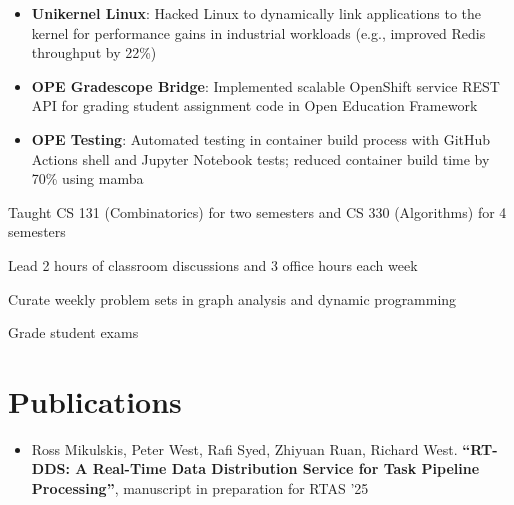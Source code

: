 \documentclass[10pt]{article}
\begin{document}
\begin{FlushLeft}
\begin{itemize}
\item \textbf{Unikernel Linux}: Hacked Linux to dynamically link applications to the kernel for performance gains in industrial workloads (e.g., improved Redis throughput by 22\%)
\item \textbf{OPE Gradescope Bridge}: Implemented scalable OpenShift service REST API for grading student assignment code in Open Education Framework
\item \textbf{OPE Testing}: Automated testing in container build process with GitHub Actions shell and Jupyter Notebook tests; reduced container build time by 70\% using mamba
\end{itemize}

  \begin{itemize}{
    \item Taught CS 131 (Combinatorics) for two semesters and CS 330 (Algorithms) for 4 semesters
    \item Lead 2 hours of classroom discussions and 3 office hours each week
    \item Curate weekly problem sets in graph analysis and dynamic programming
    \item Grade student exams
    }
  \end{itemize}

  \section{Publications}
  \begin{itemize}
  \item Ross Mikulskis, Peter West, Rafi Syed, Zhiyuan Ruan, Richard West. \textbf{``RT-DDS: A Real-Time Data Distribution Service for Task Pipeline Processing''},
manuscript in preparation for RTAS '25    
  \end{itemize}

\end{FlushLeft}
\end{document}

